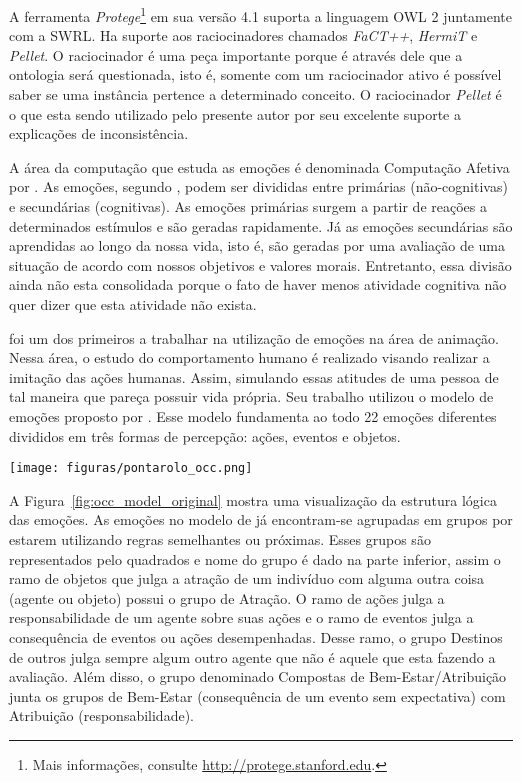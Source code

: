 A ferramenta \emph{Protege}\footnote{Mais informações, consulte \url{http://protege.stanford.edu}.}
em sua versão 4.1 suporta a linguagem OWL 2 juntamente com a SWRL. Ha suporte
aos raciocinadores chamados \emph{FaCT++}, \emph{HermiT} e \emph{Pellet}.
O raciocinador é uma peça importante porque é através dele que a ontologia
será questionada, isto é, somente com um raciocinador ativo é possível saber
se uma instância pertence a determinado conceito. O raciocinador
\emph{Pellet}\dev{} é o que esta sendo utilizado pelo presente autor por
seu excelente suporte a explicações de inconsistência.

A área da computação que estuda as emoções é denominada Computação Afetiva por
\citet{Pic98}. As emoções, segundo \citet{damasio2004erro}, podem ser divididas
entre primárias (não-cognitivas) e secundárias (cognitivas). As emoções
primárias surgem a partir de reações a determinados estímulos e são geradas
rapidamente. Já as emoções secundárias são aprendidas ao longo da nossa vida,
isto é, são geradas por uma avaliação de uma situação de acordo com nossos
objetivos e valores morais. Entretanto, essa divisão ainda não esta
consolidada porque o fato de haver menos atividade cognitiva não quer dizer
que esta atividade não exista.

\citet{bates1994role} foi um dos primeiros a trabalhar na utilização de
emoções na área de animação. Nessa área, o estudo do comportamento humano é
realizado visando realizar a imitação das ações humanas. Assim, simulando
essas atitudes de uma pessoa de tal maneira que pareça possuir vida própria.
Seu trabalho utilizou o modelo de emoções proposto por \citet{ortony1988cse}.
Esse modelo fundamenta ao todo 22 emoções diferentes divididos em três
formas de percepção: ações, eventos e objetos.

\begin{figure*}
  \centering
    \texttt{[image: figuras/pontarolo\_occ.png]}
  \caption{Modelo OCC adaptado de \cite{pontarolo2008modelagem}.}
  \label{fig:occ_model_original}
\end{figure*}

A Figura~\ref{fig:occ_model_original} mostra uma visualização da estrutura
lógica das emoções. As emoções no modelo de \citet{ortony1988cse} já
encontram-se agrupadas em grupos por estarem utilizando regras semelhantes ou
próximas. Esses grupos são representados pelo quadrados e nome do grupo é dado
na parte inferior, assim o ramo de objetos que julga a atração de um indivíduo
com alguma outra coisa (agente ou objeto) possui o grupo de Atração. O ramo de
ações julga a responsabilidade de um agente sobre suas ações e o ramo de
eventos julga a consequência de eventos ou ações desempenhadas. Desse ramo,
o grupo Destinos de outros julga sempre algum outro agente que não é aquele
que esta fazendo a avaliação. Além disso, o grupo denominado Compostas de
Bem-Estar/Atribuição junta os grupos de Bem-Estar (consequência de um evento
sem expectativa) com Atribuição (responsabilidade).

